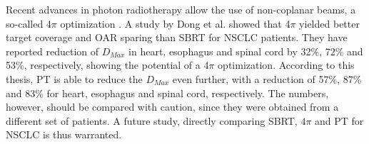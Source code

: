 \documentclass[type=dr, dr=rernat, accentcolor=tud7b,colorbacktitle, bigchapter, openright, twoside, 12pt ]{tudthesis}
\begin{document}
Recent advances in photon radiotherapy allow the use of non-coplanar beams, a so-called 4$\pi$ optimization \cite{Dong2013}. A study by Dong et al. \cite{Dong2013b} showed that
4$\pi$ yielded better target coverage and OAR sparing than SBRT for NSCLC patients. 
They have reported reduction of $D_{Max}$ in heart, esophagus and spinal cord by 32\%, 72\% and 53\%, respectively, showing
the potential of a 4$\pi$ optimization. According to this thesis, PT is able to reduce the $D_{Max}$ even further, with a reduction of 57\%, 87\% and 83\% for heart, esophagus and spinal cord,
respectively. The numbers, however, should be compared with caution, since they were obtained from a different set of patients. 
A future study, directly comparing SBRT, $4\pi$ and PT for NSCLC is thus warranted.





\end{document}
